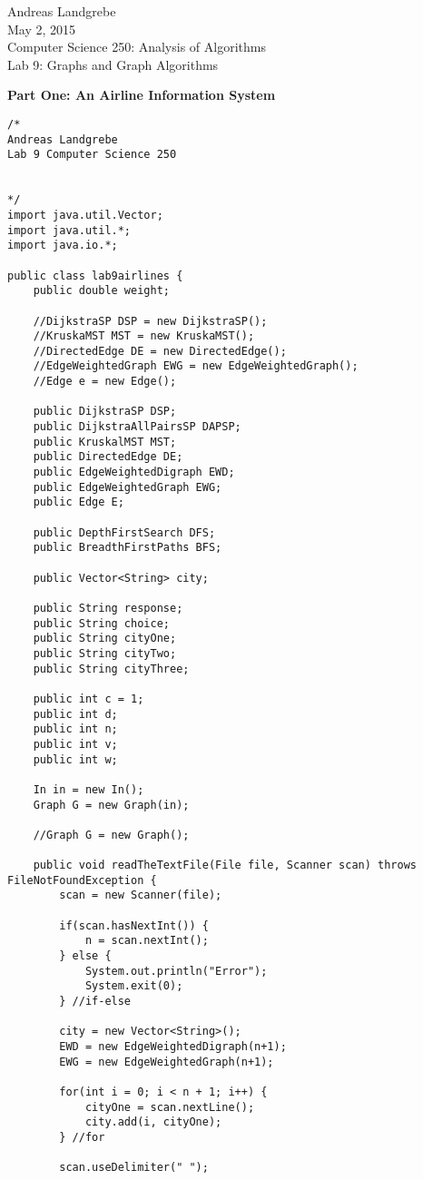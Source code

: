 \documentclass{article}
\begin{document}
\begin{center}
Andreas Landgrebe
\\
May 2, 2015
\\
Computer Science 250: Analysis of Algorithms
\\
Lab 9: Graphs and Graph Algorithms
\end{center}
\newpage
\begin{center}
\textbf{Part One: An Airline Information System}
\end{center}

\begin{lstlisting}
/*
Andreas Landgrebe
Lab 9 Computer Science 250


*/
import java.util.Vector;
import java.util.*;
import java.io.*;

public class lab9airlines {
	public double weight;

	//DijkstraSP DSP = new DijkstraSP();
	//KruskaMST MST = new KruskaMST();
	//DirectedEdge DE = new DirectedEdge();
	//EdgeWeightedGraph EWG = new EdgeWeightedGraph();
	//Edge e = new Edge();

	public DijkstraSP DSP;
	public DijkstraAllPairsSP DAPSP;
	public KruskalMST MST;
	public DirectedEdge DE;
	public EdgeWeightedDigraph EWD;
	public EdgeWeightedGraph EWG;
	public Edge E;

	public DepthFirstSearch DFS;
	public BreadthFirstPaths BFS;
	
	public Vector<String> city;

	public String response;
	public String choice;
	public String cityOne;
	public String cityTwo;
	public String cityThree;

	public int c = 1;
	public int d;
	public int n;
	public int v;
	public int w;
	
	In in = new In();
	Graph G = new Graph(in);

	//Graph G = new Graph();
	
	public void readTheTextFile(File file, Scanner scan) throws FileNotFoundException {
		scan = new Scanner(file);

		if(scan.hasNextInt()) {
			n = scan.nextInt();
		} else {
			System.out.println("Error");
			System.exit(0);
		} //if-else

		city = new Vector<String>();
		EWD = new EdgeWeightedDigraph(n+1);
		EWG = new EdgeWeightedGraph(n+1);

		for(int i = 0; i < n + 1; i++) {
			cityOne = scan.nextLine();
			city.add(i, cityOne);
		} //for

		scan.useDelimiter(" ");



\end{lstlisting}
\end{document}
